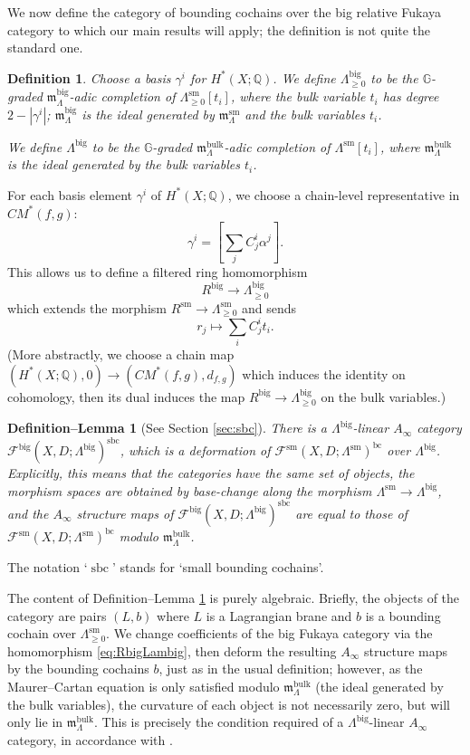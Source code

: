 \documentclass{article}
\newtheorem{defn}[lem]{Definition}
\newtheorem{deflem}[lem]{Definition--Lemma}
\def\G{\mathbb{G}}
\def\fuk{\EuF}
\def\bc{\mathsf{bc}}
\newcommand{\fm}{\mathfrak{m}}
\def\G{\mathbb{G}}
\def\fuk{\mathcal{F}}
\def\bc{{\operatorname{bc}}}
\def\Q{\mathbb{Q}}
\def\big{{\operatorname{big}}}
\def\sm{{\operatorname{sm}}}
\def\sbc{{\operatorname{sbc}}}
\def\bulk{{\operatorname{bulk}}}
\def\novb{r}
\def\novblam{t}
\begin{document}
We now define the category of bounding cochains over the big relative Fukaya category to which our main results will apply; the definition is not quite the standard one.

\begin{defn}
Choose a basis $\gamma^i$ for $H^*(X;\Q)$. 
We define $\Lambda^\big_{\ge 0}$ to be the $\G$-graded $\fm^\big_\Lambda$-adic completion of $\Lambda^\sm_{\ge 0}[\novblam_i]$, where the bulk variable $\novblam_i$ has degree $2-|\gamma^i|$; $\fm^\big_\Lambda$ is the ideal generated by $\fm^\sm_\Lambda$ and the bulk variables $\novblam_i$. 

We define $\Lambda^\big$ to be the $\G$-graded $\fm^{\bulk}_\Lambda$-adic completion of $\Lambda^\sm[\novblam_i]$, where $\fm^{\bulk}_\Lambda$ is the ideal generated by the bulk variables $\novblam_i$. 
\end{defn}

For each basis element $\gamma^i$ of $H^*(X;\Q)$, we choose a chain-level representative in $CM^*(f,g)$:
$$\gamma^i = \left[ \sum_j C^i_j \alpha^j \right].$$
This allows us to define a filtered ring homomorphism
\begin{equation}\label{eq:RbigLambig}
R^\big \to \Lambda^\big_{\ge 0}
\end{equation}
which extends the morphism $R^\sm \to \Lambda^\sm_{\ge 0}$ and sends
$$\novb_j \mapsto \sum_i C^i_j \novblam_i.$$
(More abstractly, we choose a chain map $(H^*(X;\Q),0) \to (CM^*(f,g),d_{f,g})$ which induces the identity on cohomology, then its dual induces the map $R^\big \to \Lambda^\big_{\ge 0}$ on the bulk variables.)

\begin{deflem}[See Section \ref{sec:sbc}]\label{deflem:bigsmall}
    There is a $\Lambda^\big$-linear $A_\infty$ category $\fuk^\big(X,D;\Lambda^\big)^\sbc$, which is a deformation of $\fuk^\sm(X,D;\Lambda^\sm)^\bc$ over $\Lambda^\big$. 
    Explicitly, this means that the categories have the same set of objects, the morphism spaces are obtained by base-change along the morphism $\Lambda^\sm \to \Lambda^\big$, and the $A_\infty$ structure maps of $\fuk^\big(X,D;\Lambda^\big)^\sbc$ are equal to those of $\fuk^\sm(X,D;\Lambda^\sm)^\bc$ modulo $\fm^{\bulk}_\Lambda$.
\end{deflem}

The notation `$\sbc$' stands for `small bounding cochains'.

The content of Definition--Lemma \ref{deflem:bigsmall} is purely algebraic. 
Briefly, the objects of the category are pairs $(L,b)$ where $L$ is a Lagrangian brane and $b$ is a bounding cochain over $\Lambda^\sm_{\ge 0}$. 
We change coefficients of the big Fukaya category via the homomorphism \eqref{eq:RbigLambig}, then deform the resulting $A_\infty$ structure maps by the bounding cochains $b$, just as in the usual definition; however, as the Maurer--Cartan equation is only satisfied modulo $\fm^{\bulk}_\Lambda$ (the ideal generated by the bulk variables), the curvature of each object is not necessarily zero, but will only lie in $\fm^{\bulk}_\Lambda$. 
This is precisely the condition required of a $\Lambda^\big$-linear $A_\infty$ category, in accordance with \cite[Definition 2.10]{relfukii}. 
\end{document}
